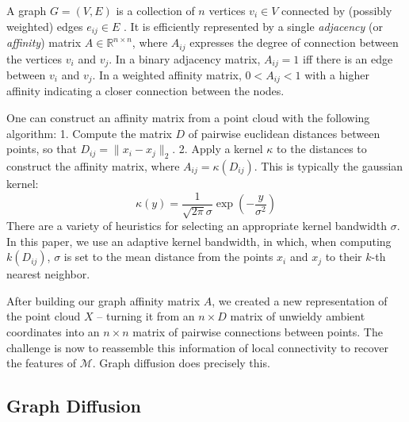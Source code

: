 \documentclass[
  letterpaper,
  DIV=11,
  numbers=noendperiod]{scrartcl}
\theoremstyle{plain}
\theoremstyle{plain}
\theoremstyle{definition}
\theoremstyle{plain}
\theoremstyle{definition}
\theoremstyle{plain}
\theoremstyle{remark}
\begin{document}
A graph \(G = (V, E)\) is a collection of \(n\) vertices \(v_{i} \in V\)
connected by (possibly weighted) edges \(e_{ij} \in E\) . It is
efficiently represented by a single \emph{adjacency} (or
\emph{affinity}) matrix \(A \in \mathbb{R}^{n \times n}\), where
\(A_{ij}\) expresses the degree of connection between the vertices
\(v_{i}\) and \(v_{j}\). In a binary adjacency matrix, \(A_{ij}=1\) iff
there is an edge between \(v_{i}\) and \(v_{j}\). In a weighted affinity
matrix, \(0<A_{ij}<1\) with a higher affinity indicating a closer
connection between the nodes.

One can construct an affinity matrix from a point cloud with the
following algorithm: 1. Compute the matrix \(D\) of pairwise euclidean
distances between points, so that \(D_{ij}=\|x_{i}-x_{j}\|_{2}\). 2.
Apply a kernel \(\kappa\) to the distances to construct the affinity
matrix, where \(A_{ij} = \kappa(D_{ij})\). This is typically the
gaussian kernel: \[
\kappa(y) = \frac{1}{\sqrt{ 2\pi }\sigma}\exp\left( -\frac{y}{\sigma^2} \right)
\] There are a variety of heuristics for selecting an appropriate kernel
bandwidth \(\sigma\). In this paper, we use an adaptive kernel
bandwidth, in which, when computing \(k(D_{ij})\), \(\sigma\) is set to
the mean distance from the points \(x_{i}\) and \(x_{j}\) to their
\(k\)-th nearest neighbor.

After building our graph affinity matrix \(A\), we created a new
representation of the point cloud \(X\) -- turning it from an
\(n \times D\) matrix of unwieldy ambient coordinates into an
\(n \times n\) matrix of pairwise connections between points. The
challenge is now to reassemble this information of local connectivity to
recover the features of \(\mathcal{M}\). Graph diffusion does precisely
this.

\subsection{Graph Diffusion}\label{graph-diffusion}
\end{document}
